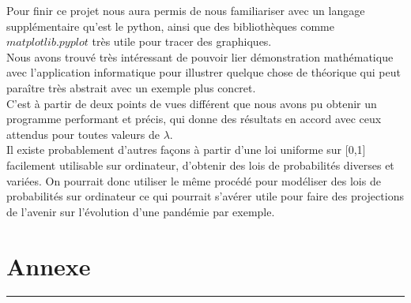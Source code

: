 \documentclass[12,french]{report}
\begin{document}
Pour finir ce projet nous aura permis de nous familiariser avec un langage supplémentaire qu'est le python, ainsi que des bibliothèques comme $matplotlib.pyplot$ très utile pour tracer des graphiques.\\

Nous avons trouvé très intéressant de pouvoir lier démonstration mathématique avec l'application informatique pour illustrer quelque chose de théorique qui peut paraître très abstrait avec un exemple plus concret.\\

C'est à partir de deux points de vues différent que nous avons pu obtenir un programme performant et précis, qui donne des résultats en accord avec ceux attendus pour toutes valeurs de $\lambda$.\\

Il existe probablement d'autres façons à partir d'une loi uniforme sur [0,1] facilement utilisable sur ordinateur, d'obtenir des lois de probabilités diverses et variées. On pourrait donc utiliser le même procédé pour modéliser des lois de probabilités sur ordinateur ce qui pourrait s'avérer utile pour faire des projections de l'avenir sur l'évolution d'une pandémie par exemple. 

\chapter*{Annexe}

\hrule
\begin{lstlisting}[caption=Programme en Python]
	
\end{lstlisting}


\end{document}
